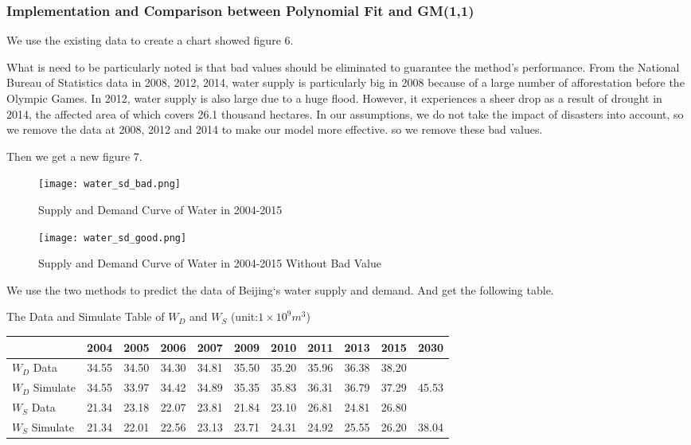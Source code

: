 \documentclass{mcmthesis}
\begin{document}
\subsubsection{Implementation and Comparison between Polynomial Fit and GM(1,1)}
\par We use the existing data to create a chart showed figure 6. 
\par What is need to be particularly noted is that bad values should be eliminated to guarantee the method’s performance. From the National Bureau of Statistics data in 2008, 2012, 2014, water supply is particularly big in 2008 because of a large number of afforestation before the Olympic Games. In 2012, water supply is also large due to a huge flood. However, it experiences a sheer drop as a result of drought in 2014, the affected area of which covers 26.1 thousand hectares. In our assumptions, we do not take the impact of disasters into account, so we remove the data at 2008, 2012 and 2014 to make our model more effective. so we remove these bad values. 
\par Then we get a new figure 7.

\begin{figure}[htbp]  
\begin{minipage}[t]{0.5\textwidth}
\centering  
\texttt{[image: water\_sd\_bad.png]}  
\caption{Supply and Demand Curve of Water in 2004-2015} 
\end{minipage}
\hspace{1ex}
\begin{minipage}[t]{0.5\textwidth}  
\centering  
\texttt{[image: water\_sd\_good.png]}  
\caption{Supply and Demand Curve of Water in 2004-2015 Without Bad Value}  
\end{minipage}  
\end{figure} 

\par We use the two methods to predict the data of Beijing`s water supply and demand. And get the following table.

\begin{center}

	The Data and Simulate Table of $W_D$ and $W_S$ (unit:$1\times10^9m^3$) 
	
\begin{tabular}{l|cccccccccc}
\toprule
 & 2004 & 2005 & 2006 & 2007 & 2009 & 2010 & 2011 & 2013 & 2015 & 2030\\
\midrule
$W_D$ Data & 34.55 & 34.50 & 34.30 & 34.81	& 35.50 & 35.20 & 35.96 & 36.38 &	38.20 & \\
$W_D$ Simulate & 34.55 & 33.97 & 34.42 & 34.89 & 35.35 & 35.83 & 36.31 & 36.79 & 37.29 & 45.53\\
$W_S$ Data & 21.34 & 23.18 & 22.07 & 23.81 & 21.84 & 23.10 & 26.81 & 24.81 & 26.80 & \\
$W_S$ Simulate & 21.34 & 22.01 & 22.56 & 23.13 & 23.71 & 24.31 & 24.92 & 	25.55 & 26.20 & 38.04\\
\bottomrule
\end{tabular}


\end{center}
\end{document}
